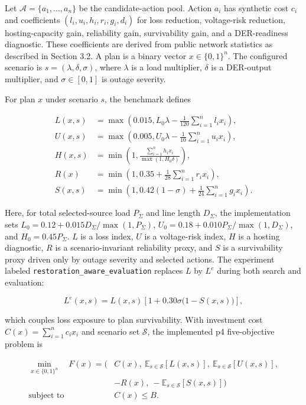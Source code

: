 \documentclass[energies,article,submit,moreauthors]{Definitions/mdpi}
\begin{document}
Let \(\mathcal{A}=\{a_1,\ldots,a_n\}\) be the candidate-action pool. Action \(a_i\) has synthetic cost \(c_i\) and coefficients \((l_i,u_i,h_i,r_i,g_i,d_i)\) for loss reduction, voltage-risk reduction, hosting-capacity gain, reliability gain, survivability gain, and a DER-readiness diagnostic. These coefficients are derived from public network statistics as described in Section 3.2. A plan is a binary vector \(x\in\{0,1\}^n\). The configured scenario is \(s=(\lambda,\delta,\sigma)\), where \(\lambda\) is a load multiplier, \(\delta\) is a DER-output multiplier, and \(\sigma\in[0,1]\) is outage severity.

For plan \(x\) under scenario \(s\), the benchmark defines

\[
\begin{aligned}
L(x,s)&=\max\!\left(0.015,L_0\lambda-\frac{1}{120}\sum_{i=1}^{n}l_i x_i\right),\\
U(x,s)&=\max\!\left(0.005,U_0\lambda-\frac{1}{10}\sum_{i=1}^{n}u_i x_i\right),\\
H(x,s)&=\min\!\left(1,\frac{\sum_{i=1}^{n}h_i x_i}{\max(1,H_0\delta)}\right),\\
R(x)&=\min\!\left(1,0.35+\frac{1}{28}\sum_{i=1}^{n}r_i x_i\right),\\
S(x,s)&=\min\!\left(1,0.42(1-\sigma)+\frac{1}{24}\sum_{i=1}^{n}g_i x_i\right).
\end{aligned}
\]

Here, for total selected-source load \(P_\Sigma\) and line length \(D_\Sigma\), the implementation sets \(L_0=0.12+0.015D_\Sigma/\max(1,P_\Sigma)\), \(U_0=0.18+0.010P_\Sigma/\max(1,D_\Sigma)\), and \(H_0=0.45P_\Sigma\). \(L\) is a loss index, \(U\) is a voltage-risk index, \(H\) is a hosting diagnostic, \(R\) is a scenario-invariant reliability proxy, and \(S\) is a survivability proxy driven only by outage severity and selected actions. The experiment labeled \texttt{restoration\_aware\_evaluation} replaces \(L\) by \(L^e\) during both search and evaluation:

\[
L^{e}(x,s)=L(x,s)\left[1+0.30\sigma\bigl(1-S(x,s)\bigr)\right],
\]

which couples loss exposure to plan survivability. With investment cost \(C(x)=\sum_{i=1}^{n}c_i x_i\) and scenario set \(\mathcal{S}\), the implemented p4 five-objective problem is

\[
\begin{aligned}
\min_{x\in\{0,1\}^{n}}\quad
F(x)=\Big(&C(x),\ \mathbb{E}_{s\in\mathcal{S}}[L(x,s)],\
\mathbb{E}_{s\in\mathcal{S}}[U(x,s)],\\
&-R(x),\ -\mathbb{E}_{s\in\mathcal{S}}[S(x,s)]\Big)\\
\text{subject to}\quad &C(x)\leq B.
\end{aligned}
\]
\end{document}
